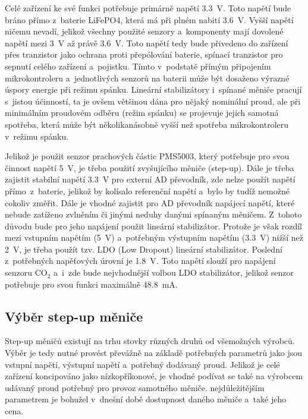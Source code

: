 Celé zařízení ke své funkci potřebuje primárně napětí \SI{3,3}{\volt}. Toto napětí bude bráno přímo z~baterie LiFePO4, která má při plném nabití \SI{3,6}{\volt}. Vyšší napětí ničemu nevadí, jelikož všechny použité senzory a~komponenty mají dovolené napětí mezi \SI{3}{\volt} až právě \SI{3,6}{\volt}. Toto napětí tedy bude přivedeno do zařízení přes tranzistor jako ochrana proti přepólování baterie, spínací tranzistor pro sepnutí celého zařízení a~pojistku. Tímto v~podstatě přímým připojením mikrokontroleru a~jednotlivých senzorů na baterii může být dosaženo výrazné úspory energie při režimu spánku. Lineární stabilizátory i~spínané měniče pracují s~jistou účinností, ta je ovšem většinou dána pro nějaký nominální proud, ale při minimálním proudovém odběru (režim spánku) se projevuje jejich samotná spotřeba, která může být několikanásobně vyšší než spotřeba mikrokontroleru v~režimu spánku.

Jelikož je použit senzor prachových částic PMS5003, který potřebuje pro svou činnost napětí \SI{5}{\volt}, je třeba použití zvyšujícího měniče (step-up). Dále je třeba zajistit stabilní napětí \SI{3,3}{\volt} pro externí AD převodník, zde nelze použít napětí přímo~z~baterie, jelikož by kolísalo referenční napětí a~bylo by tudíž nemožné cokoliv změřit. Dále je vhodné zajistit pro AD převodník napájecí napětí, které nebude zatíženo zvlněním či jinými neduhy danými spínaným měničem. Z~tohoto důvodu bude pro jeho napájení použit lineární stabilizátor. Protože je však rozdíl mezi vstupním napětím (\SI{5}{\volt}) a~potřebným výstupním napětím (\SI{3,3}{\volt}) nižší než \SI{2}{\volt}, je třeba použít tzv. LDO (Low Dropout) lineární stabilizátor. Poslední z~potřebných napěťových úrovní je \SI{1.8}{\volt}. Toto napětí slouží pro napájení senzoru CO$_2$ a~i~zde bude nejvhodnější volbou LDO stabilizátor, jelikož senzor potřebuje pro svou funkci maximálně \SI{48.8}{\milli\ampere}.

\subsection{Výběr step-up měniče}

Step-up měničů existují na trhu stovky různých druhů od všemožných výrobců. Výběr je tedy nutné provést převážně na základě potřebných parametrů jako jsou vstupní napětí, výstupní napětí a~potřebný dodávaný proud. Jelikož je celé zařízení koncipováno jako nízkopříkonové, je vhodné podívat se také na výrobcem udávaný proud potřebný pro provoz samotného měniče. nejdůležitějším parametrem je bohužel v~dnešní době dostupnost daného měniče a~také jeho cena.

